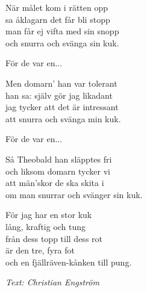 \vspace{8pt}
När målet kom i rätten opp\\
sa åklagarn det får bli stopp\\
man får ej vifta med sin snopp\\
och snurra och svänga sin kuk.\par
\vspace{8pt}
För de var en...\par
\vspace{8pt}
Men domarn' han var tolerant\\
han sa: själv gör jag likadant\\
jag tycker att det är intressant\\
att snurra och svänga min kuk.\par
\vspace{8pt}
För de var en...\par
\vspace{8pt}
Så Theobald han släpptes fri\\
och liksom domarn tycker vi\\
att män'skor de ska skita i\\
om man snurrar och svänger sin kuk.\par
\vspace{10pt}
För jag har en stor kuk\\
lång, kraftig och tung\\
från dess topp till dess rot\\
är den tre, fyra fot\\
och en fjällräven-kånken till pung.\par
\vspace{10pt}
{\footnotesize\textit{Text: Christian Engström}}
